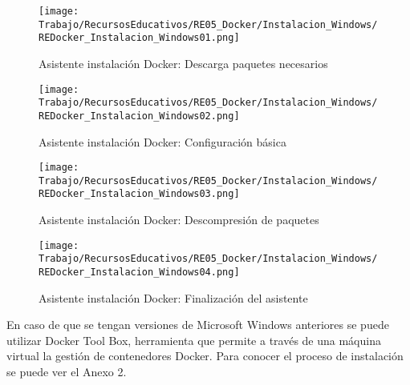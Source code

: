 \begin{figure}[!hbtp]
	\centering
	\texttt{[image: Trabajo/RecursosEducativos/RE05\_Docker/Instalacion\_Windows/REDocker\_Instalacion\_Windows01.png]}
	\vspace{-0.2cm}
	\caption{Asistente instalación Docker: Descarga paquetes necesarios}
	\label{fig:InstalacionDockerWin1}
\end{figure}

\begin{figure}[!hbtp]
	\centering
	\texttt{[image: Trabajo/RecursosEducativos/RE05\_Docker/Instalacion\_Windows/REDocker\_Instalacion\_Windows02.png]}
	\vspace{-0.2cm}
	\caption{Asistente instalación Docker: Configuración básica}
	\label{fig:InstalacionDockerWin2}
\end{figure}

\begin{figure}[!hbtp]
	\centering
	\texttt{[image: Trabajo/RecursosEducativos/RE05\_Docker/Instalacion\_Windows/REDocker\_Instalacion\_Windows03.png]}
	\vspace{-0.2cm}
	\caption{Asistente instalación Docker: Descompresión de paquetes}
	\label{fig:InstalacionDockerWin3}
\end{figure}

\begin{figure}[!hbtp]
	\centering
	\texttt{[image: Trabajo/RecursosEducativos/RE05\_Docker/Instalacion\_Windows/REDocker\_Instalacion\_Windows04.png]}
	\vspace{-0.2cm}
	\caption{Asistente instalación Docker: Finalización del asistente}
	\label{fig:InstalacionDockerWin4}
\end{figure}

En caso de que se tengan versiones de Microsoft Windows anteriores se puede utilizar Docker Tool Box, herramienta que permite a través de una máquina virtual la gestión de contenedores Docker. Para conocer el proceso de instalación se puede ver el Anexo 2.